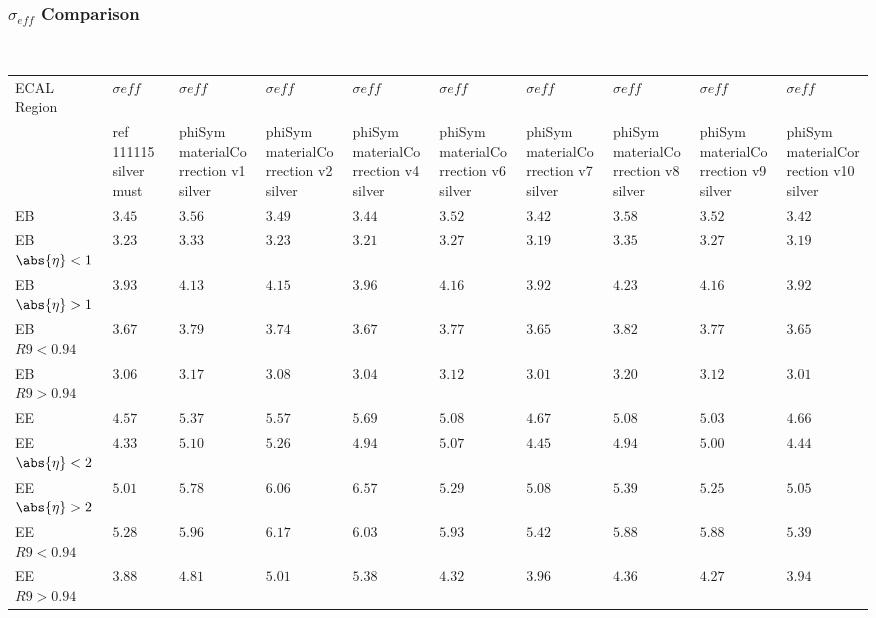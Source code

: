 \documentclass[8pt,serif]{beamer}
\begin{document}
\begin{frame}
  \frametitle{$ \sigma_{eff} $ Comparison}
\\


  
  \begin{center}
    \emph{\dataSample}\xspace \invMassVarName

\tiny \begin{tabular}{|l|p{30pt}|p{18pt}|p{18pt}|p{18pt}|p{18pt}|p{18pt}|p{18pt}|p{18pt}|p{18pt}|} \hline  
ECAL Region &  $\sigma {eff}$ &  $\sigma {eff}$ &  $\sigma {eff}$ &  $\sigma {eff}$ &  $\sigma {eff}$ &  $\sigma {eff}$ &  $\sigma {eff}$ &  $\sigma {eff}$ &  $\sigma {eff}$ \\ 
 &  ref 111115 silver must &  phiSym materialCorrection v1 silver &  phiSym materialCorrection v2 silver &  phiSym materialCorrection v4 silver &  phiSym materialCorrection v6 silver &  phiSym materialCorrection v7 silver &  phiSym materialCorrection v8 silver &  phiSym materialCorrection v9 silver &  phiSym materialCorrection v10 silver \\ 
\hline                 
EB & $3.45$ & $3.56$ & $3.49$ & $3.44$ & $3.52$ & $3.42$ & $3.58$ & $3.52$ & $3.42$ \\
EB $\abs{\eta} < 1$ & $3.23$ & $3.33$ & $3.23$ & $3.21$ & $3.27$ & $3.19$ & $3.35$ & $3.27$ & $3.19$ \\
EB $\abs{\eta} > 1$ & $3.93$ & $4.13$ & $4.15$ & $3.96$ & $4.16$ & $3.92$ & $4.23$ & $4.16$ & $3.92$ \\
EB $R9 < 0.94$ & $3.67$ & $3.79$ & $3.74$ & $3.67$ & $3.77$ & $3.65$ & $3.82$ & $3.77$ & $3.65$ \\
EB $R9 > 0.94$ & $3.06$ & $3.17$ & $3.08$ & $3.04$ & $3.12$ & $3.01$ & $3.20$ & $3.12$ & $3.01$ \\
EE & $4.57$ & $5.37$ & $5.57$ & $5.69$ & $5.08$ & $4.67$ & $5.08$ & $5.03$ & $4.66$ \\
EE $\abs{\eta} < 2$ & $4.33$ & $5.10$ & $5.26$ & $4.94$ & $5.07$ & $4.45$ & $4.94$ & $5.00$ & $4.44$ \\
EE $\abs{\eta} > 2$ & $5.01$ & $5.78$ & $6.06$ & $6.57$ & $5.29$ & $5.08$ & $5.39$ & $5.25$ & $5.05$ \\
EE $R9 < 0.94$ & $5.28$ & $5.96$ & $6.17$ & $6.03$ & $5.93$ & $5.42$ & $5.88$ & $5.88$ & $5.39$ \\
EE $R9 > 0.94$ & $3.88$ & $4.81$ & $5.01$ & $5.38$ & $4.32$ & $3.96$ & $4.36$ & $4.27$ & $3.94$ \\
\hline  
\end{tabular} 
  \end{center}
\end{frame}
\end{document}
